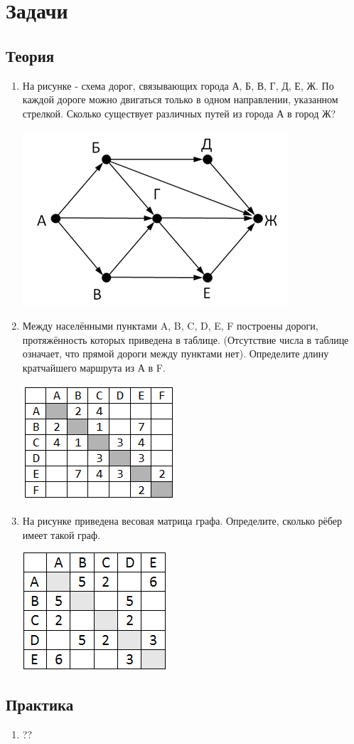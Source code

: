\documentclass[12pt]{article}
\begin{document}
\section*{Задачи}
\subsection*{Теория}
\begin{enumerate}
\item На рисунке - схема дорог, связывающих города А, Б, В, Г, Д, Е, Ж. По каждой дороге можно двигаться только в одном направлении, указанном стрелкой. Сколько существует различных путей из города А в город Ж?

\includegraphics[width=0.3333\linewidth]{numway4}

\item Между населёнными пунктами A, B, C, D, E, F построены дороги, протяжённость которых приведена в таблице. (Отсутствие числа в таблице означает, что прямой дороги между пунктами нет). Определите длину кратчайшего маршрута из А в F.

\includegraphics[width=0.3333\linewidth]{minaf}

\item На рисунке приведена весовая матрица графа. Определите, сколько рёбер имеет такой граф.

\includegraphics[width=0.3333\linewidth]{numribs1}

\end{enumerate}

\subsection*{Практика}
\begin{enumerate}
\item ??


\end{enumerate}
\end{document}
